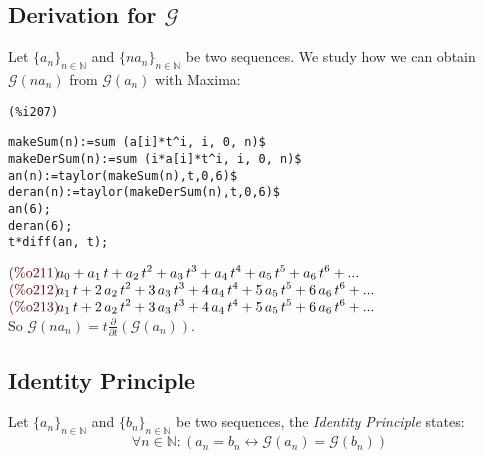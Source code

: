 \subsection{Derivation for $\mathcal{G} $}

Let $\{a_n\}_{n\in\mathbb{N} }$ and $\{n a_{n}\}_{n\in\mathbb{N} } $
be two sequences. We study how we can obtain $\mathcal{G}(n a_{n}) $
from $\mathcal{G} (a_n)$ with Maxima:\\
\noindent
\begin{minipage}[t]{8ex}{\color{red}\bf
\begin{verbatim}
(%i207) 
\end{verbatim}}
\end{minipage}
\begin{minipage}[t]{\textwidth}{\color{blue}
\begin{verbatim}
makeSum(n):=sum (a[i]*t^i, i, 0, n)$
makeDerSum(n):=sum (i*a[i]*t^i, i, 0, n)$
an(n):=taylor(makeSum(n),t,0,6)$
deran(n):=taylor(makeDerSum(n),t,0,6)$
an(6);
deran(6);
t*diff(an, t);
\end{verbatim}}
\end{minipage}
\begin{math}\displaystyle
\parbox{8ex}{\color{labelcolor}(\%o211) }
{a}_{0}+{a}_{1}\,t+{a}_{2}\,{t}^{2}+{a}_{3}\,{t}^{3}+{a}_{4}\,{t}^{4}+{a}_{5}\,{t}^{5}+{a}_{6}\,{t}^{6}+...
\end{math}\\
\begin{math}\displaystyle
\parbox{8ex}{\color{labelcolor}(\%o212) }
{a}_{1}\,t+2\,{a}_{2}\,{t}^{2}+3\,{a}_{3}\,{t}^{3}+4\,{a}_{4}\,{t}^{4}+5\,{a}_{5}\,{t}^{5}+6\,{a}_{6}\,{t}^{6}+...
\end{math}\\
\begin{math}\displaystyle
\parbox{8ex}{\color{labelcolor}(\%o213) }
{a}_{1}\,t+2\,{a}_{2}\,{t}^{2}+3\,{a}_{3}\,{t}^{3}+4\,{a}_{4}\,{t}^{4}+5\,{a}_{5}\,{t}^{5}+6\,{a}_{6}\,{t}^{6}+...
\end{math}\\
So $\mathcal{G}(n a_n) = t \frac{\partial}{\partial t}\left(
  \mathcal{G} (a_n) \right) $.

\subsection{Identity Principle}

Let $\{a_n\}_{n\in\mathbb{N} } $ and $\{b_n\}_{n\in\mathbb{N} } $ be
two sequences, the \emph{Identity Principle} states:
\begin{displaymath}
  \forall n \in \mathbb{N}: \left( a_n = b_n \leftrightarrow
    \mathcal{G} (a_n) = \mathcal{G} (b_n)\right)
\end{displaymath}


